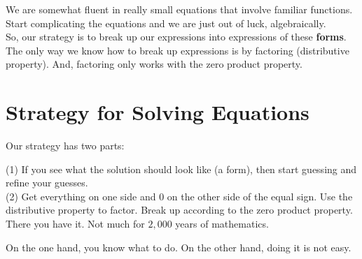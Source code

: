 \documentclass{ximera}
\begin{document}
We are somewhat fluent in really small equations that involve familiar functions.   \\



Start complicating the equations and we are just out of luck, algebraically. \\


So, our strategy is to break up our expressions into expressions of these \textbf{\textcolor{blue!55!black}{forms}}.  The only way we know how to break up expressions is by factoring (distributive property).  And, factoring only works with the zero product property.















\section*{Strategy for Solving Equations}


Our strategy has two parts:


(1) If you see what the solution should look like (a form), then start guessing and refine your guesses.\\
(2) Get everything on one side and $0$ on the other side of the equal sign. Use the distributive property to factor.  Break up according to the zero product property. \\




There you have it. Not much for $2,000$ years of mathematics.

On the one hand, you know what to do.  On the other hand, doing it is not easy.
\end{document}

